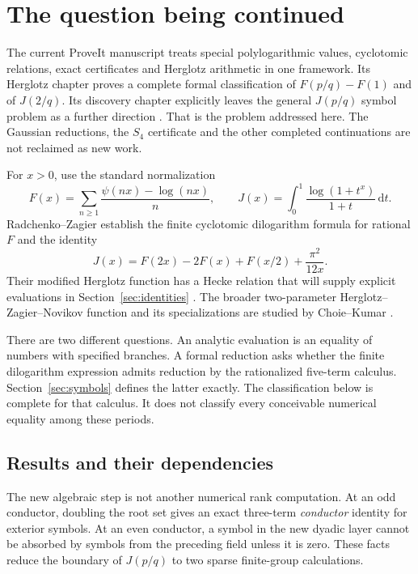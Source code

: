 \documentclass[11pt]{article}
\numberwithin{equation}{section}
\theoremstyle{definition}
\theoremstyle{remark}
\newcommand{\dd}{\,\mathrm d}
\begin{document}
\section{The question being continued}
\label{sec:context}

The current ProveIt manuscript treats special polylogarithmic values,
cyclotomic relations, exact certificates and Herglotz arithmetic in one
framework. Its Herglotz chapter proves a complete formal classification
of $F(p/q)-F(1)$ and of $J(2/q)$. Its discovery chapter explicitly leaves
the general $J(p/q)$ symbol problem as a further direction
\cite{Repo}. That is the problem addressed here. The Gaussian reductions,
the $S_4$ certificate and the other completed continuations are not
reclaimed as new work.

For $x>0$, use the standard normalization
\begin{equation}\label{eq:def-FJ}
 F(x)=\sum_{n\ge1}\frac{\psi(nx)-\log(nx)}{n},
 \qquad J(x)=\int_0^1\frac{\log(1+t^x)}{1+t}\dd t.
\end{equation}
Radchenko--Zagier establish the finite cyclotomic dilogarithm formula for
rational $F$ and the identity
\begin{equation}\label{eq:J-F}
 J(x)=F(2x)-2F(x)+F(x/2)+\frac{\pi^2}{12x}.
\end{equation}
Their modified Herglotz function has a Hecke relation that will supply
explicit evaluations in Section~\ref{sec:identities} \cite{RZ}.
The broader two-parameter Herglotz--Zagier--Novikov function and its
specializations are studied by Choie--Kumar \cite{CK}.

There are two different questions. An analytic evaluation is an equality
of numbers with specified branches. A formal reduction asks whether the
finite dilogarithm expression admits reduction by the rationalized
five-term calculus. Section~\ref{sec:symbols} defines the latter exactly.
The classification below is complete for that calculus. It does not
classify every conceivable numerical equality among these periods.

\subsection{Results and their dependencies}

The new algebraic step is not another numerical rank computation. At an
odd conductor, doubling the root set gives an exact three-term
\emph{conductor} identity for exterior symbols. At an even conductor,
a symbol in the new dyadic layer cannot be absorbed by symbols from
the preceding field unless it is zero. These facts reduce the boundary
of $J(p/q)$ to two sparse finite-group calculations.
\end{document}
